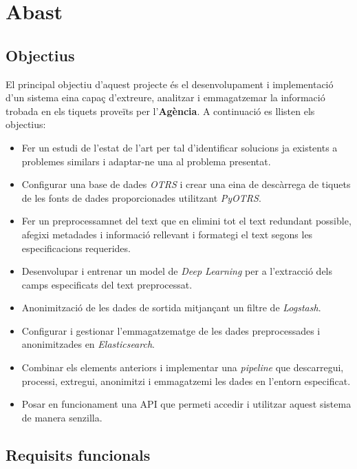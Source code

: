 \section{Abast}

\subsection{Objectius} \label{ssec:objectius}

El principal objectiu d'aquest projecte és el desenvolupament i implementació d'un sistema eina capaç d'extreure, analitzar i emmagatzemar la informació trobada en els tiquets proveïts per l'\textbf{Agència}. A continuació es llisten els objectius:

\begin{itemize}
    \item Fer un estudi de l'estat de l'art per tal d'identificar solucions ja existents a problemes similars i adaptar-ne una al problema presentat.
    \item Configurar una base de dades \textit{OTRS} i crear una eina de descàrrega de tiquets de les fonts de dades proporcionades utilitzant \textit{PyOTRS}.
    \item Fer un preprocessamnet del text que en elimini tot el text redundant possible, afegixi metadades i informació rellevant i formategi el text segons les especificacions requerides.
    \item Desenvolupar i entrenar un model de \textit{Deep Learning} per a l'extracció dels camps especificats del text preprocessat.
    \item Anonimització de les dades de sortida mitjançant un filtre de \textit{Logstash}.
    \item Configurar i gestionar l'emmagatzematge de les dades preprocessades i anonimitzades en \textit{Elasticsearch}.
    \item Combinar els elements anteriors i implementar una \textit{pipeline} que descarregui, processi, extregui, anonimitzi i emmagatzemi les dades en l'entorn especificat.
    \item Posar en funcionament una API que permeti accedir i utilitzar aquest sistema de manera senzilla.
\end{itemize}


\subsection{Requisits funcionals}


